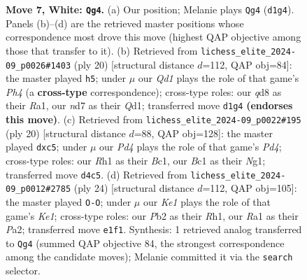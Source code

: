 \documentclass[11pt]{article}
\begin{document}
\begin{figure}[p]
\caption{\textbf{Move 7, White: \texttt{Qg4}.} (a) Our position; Melanie plays \texttt{Qg4} (\texttt{d1g4}). Panels (b)--(d) are the retrieved master positions whose correspondence most drove this move (highest QAP objective among those that transfer to it). (b) Retrieved from \texttt{lichess\_elite\_2024-09\_p0026\#1403} (ply 20) [structural distance $d$=112, QAP obj=84]: the master played \texttt{h5}; under $\mu$ our \emph{Qd1} plays the role of that game's \emph{Ph4} (a \textbf{cross-type} correspondence); cross-type roles: our \emph{q}d8 as their \emph{R}a1, our \emph{n}d7 as their \emph{Q}d1; transferred move \texttt{d1g4} \textbf{(endorses this move)}. (c) Retrieved from \texttt{lichess\_elite\_2024-09\_p0022\#195} (ply 20) [structural distance $d$=88, QAP obj=128]: the master played \texttt{dxc5}; under $\mu$ our \emph{Pd4} plays the role of that game's \emph{Pd4}; cross-type roles: our \emph{R}h1 as their \emph{B}c1, our \emph{B}c1 as their \emph{N}g1; transferred move \texttt{d4c5}. (d) Retrieved from \texttt{lichess\_elite\_2024-09\_p0012\#2785} (ply 24) [structural distance $d$=112, QAP obj=105]: the master played \texttt{O-O}; under $\mu$ our \emph{Ke1} plays the role of that game's \emph{Ke1}; cross-type roles: our \emph{P}b2 as their \emph{R}h1, our \emph{R}a1 as their \emph{P}a2; transferred move \texttt{e1f1}. Synthesis: 1 retrieved analog transferred to \texttt{Qg4} (summed QAP objective 84, the strongest correspondence among the candidate moves); Melanie committed it via the \texttt{search} selector.}
\label{fig:thought-m12}
\end{figure}

\clearpage
\end{document}
